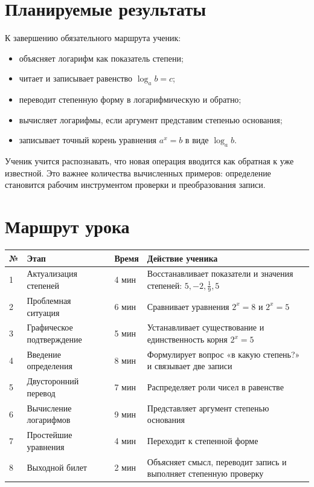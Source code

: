 \section{Планируемые результаты}

\begin{propertybox}
  К завершению обязательного маршрута ученик:
  \begin{itemize}
    \item объясняет логарифм как показатель степени;
    \item читает и записывает равенство \(\log_a b=c\);
    \item переводит степенную форму в логарифмическую и обратно;
    \item вычисляет логарифмы, если аргумент представим степенью основания;
    \item записывает точный корень уравнения \(a^x=b\) в виде \(\log_a b\).
  \end{itemize}
\end{propertybox}

\begin{teacherbox}
  Ученик учится распознавать, что новая операция вводится как обратная к
  уже известной. Это важнее количества вычисленных примеров: определение
  становится рабочим инструментом проверки и преобразования записи.
\end{teacherbox}

\section{Маршрут урока}

\begin{center}
  \small
  \renewcommand{\arraystretch}{1.34}
  \begin{tabularx}{\textwidth}{@{}p{}p{}p{}X@{}}
    \toprule
    \rowcolor{TableHeader}
    № & Этап & Время & Действие ученика \\
    \midrule
    1 & Актуализация степеней & 4 мин & Восстанавливает показатели и
      значения степеней: \(5,-2,\frac19,5\) \\
    2 & Проблемная ситуация & 6 мин & Сравнивает уравнения
      \(2^x=8\) и \(2^x=5\) \\
    3 & Графическое подтверждение & 5 мин & Устанавливает существование и
      единственность корня \(2^x=5\) \\
    4 & Введение определения & 8 мин & Формулирует вопрос «в какую степень?»
      и связывает две записи \\
    5 & Двусторонний перевод & 7 мин & Распределяет роли чисел в равенстве \\
    6 & Вычисление логарифмов & 9 мин & Представляет аргумент степенью
      основания \\
    7 & Простейшие уравнения & 4 мин & Переходит к степенной форме \\
    8 & Выходной билет & 2 мин & Объясняет смысл, переводит запись и
      выполняет степенную проверку \\
    \bottomrule
  \end{tabularx}
\end{center}

